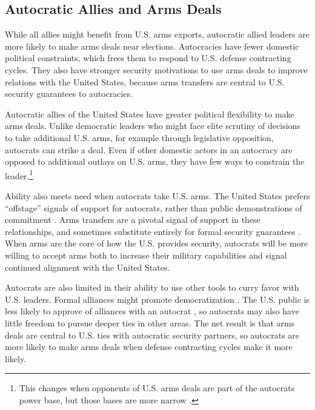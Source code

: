 \documentclass[12pt]{article}
\begin{document}
\subsection{Autocratic Allies and Arms Deals}


While all allies might benefit from U.S. arms exports, autocratic allied leaders are more likely to make arms deals near elections. 
Autocracies have fewer domestic political constraints, which frees them to respond to U.S. defense contracting cycles.
They also have stronger security motivations to use arms deals to improve relations with the United States, because arms transfers are central to U.S. security guarantees to autocracies.


Autocratic allies of the United States have greater political flexibility to make arms deals. 
Unlike democratic leaders who might face elite scrutiny of decisions to take additional U.S. arms, for example through legislative opposition, autocrats can strike a deal. 
Even if other domestic actors in an autocracy are opposed to additional outlays on U.S. arms, they have few ways to constrain the leader.\footnote{This changes when opponents of U.S. arms deals are part of the autocrats power base, but those bases are more narrow \citep{BDMetal2002}.}


Ability also meets need when autocrats take U.S. arms. 
The United States prefers ``offstage'' signals of support for autocrats, rather than public demonstrations of commitment \citep{McManusYarhi-Milo2017}.
Arms transfers are a pivotal signal of support in these relationships, and sometimes substitute entirely for formal security guarantees \citep{Yarhi-Miloetal2016}. 
When arms are the core of how the U.S. provides security, autocrats will be more willing to accept arms both to increase their military capabilities and signal continued alignment with the United States.


Autocrats are also limited in their ability to use other tools to curry favor with U.S. leaders.
Formal alliances might promote democratization \citep{GiblerWolford2006, Warren2016}.
The U.S. public is less likely to approve of alliances with an autocrat \citep{Alley2022}, so autocrats may also have little freedom to pursue deeper ties in other areas. 
The net result is that arms deals are central to U.S. ties with autocratic security partners, so autocrats are more likely to make arms deals when defense contracting cycles make it more likely. 
\end{document}
